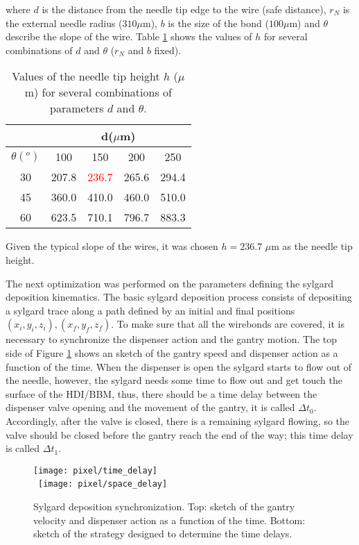 \noindent where $d$ is the distance from the needle tip edge to the wire (safe distance), $r_N$ is the external needle radius ($310 \mu$m), $b$ is the size of the bond ($100 \mu$m) and $\theta$ describe the slope of the wire. Table \ref{tab:needle_tip_heights} shows the values of $h$ for several combinations of $d$ and $\theta$ ($r_N$ and $b$ fixed).
\begin{table}
  \centering
  \begin{tabular}{ c  c  c  c  c } \hline
               &\multicolumn{4}{c}{d($\mu$m)}\\\hline
  $\theta(^o)$ & 100   & 150   & 200   & 250 \\\hline
    30         & 207.8 & \textcolor{red}{236.7} & 265.6 & 294.4 \\
    45         & 360.0 & 410.0 & 460.0 & 510.0 \\
    60         & 623.5 & 710.1 & 796.7 & 883.3 \\\hline
  \end{tabular}
  \caption[Values of the needle tip height $h$]{Values of the needle tip height $h$ ($\mu$m) for several combinations of parameters $d$ and $\theta$. }\label{tab:needle_tip_heights}
\end{table}

Given the typical slope of the wires, it was chosen $h=236.7$ $\mu$m as the needle tip height.   

The next optimization was performed on the parameters defining the sylgard deposition kinematics. The basic sylgard deposition process consists of depositing a sylgard trace along a path defined by an initial and final positions $(x_i, y_i, z_i), (x_f, y_f, z_f)$. To make sure that all the wirebonds are covered, it is necessary to synchronize the dispenser action and the gantry motion. The top side of Figure \ref{fig:sylgard_synch} shows an sketch of the gantry speed and dispenser action as a function of the time. When the dispenser is open the sylgard starts to flow out of the needle, however, the sylgard needs some time to flow out and get touch the surface of the HDI/BBM, thus, there should be a time delay between the dispenser valve opening and the movement of the gantry, it is called $\Delta t_0$. Accordingly, after the valve is closed, there is a remaining sylgard flowing, so the valve should be  closed before the gantry reach the end of the way; this time delay is called $\Delta t_1$.

\begin{figure}[h]
  \begin{center}
    \texttt{[image: pixel/time\_delay]}\\\ 
    \texttt{[image: pixel/space\_delay]}
    \caption[Sylgard deposition synchronization.]{Sylgard deposition synchronization. Top: sketch of the gantry velocity and dispenser action as a function of the time. Bottom: sketch of the strategy designed to determine the time delays.}\label{fig:sylgard_synch}
  \end{center}
\end{figure}

